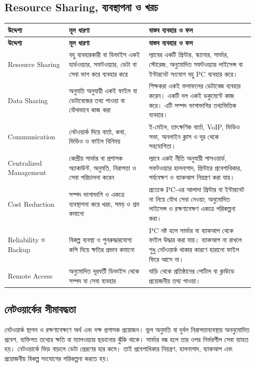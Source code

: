\subsection{Resource Sharing, ব্যবস্থাপনা ও খরচ}
\begin{longtable}{|p{}|p{}|p{}|}\hline
\textbf{উদ্দেশ্য} & \textbf{মূল ধারণা} & \textbf{বাস্তব ব্যবহার ও ফল}\\\hline
\endfirsthead\hline\textbf{উদ্দেশ্য} & \textbf{মূল ধারণা} & \textbf{বাস্তব ব্যবহার ও ফল}\\\hline\endhead
Resource Sharing & বহু ব্যবহারকারী বা ডিভাইস একই হার্ডওয়্যার, সফটওয়্যার, ডেটা বা সেবা ভাগ করে ব্যবহার করে & ল্যাবের একটি প্রিন্টার, স্ক্যানার, সার্ভার, স্টোরেজ, অনুমোদিত সফটওয়্যার লাইসেন্স বা ইন্টারনেট সংযোগ বহু PC ব্যবহার করে।\\\hline
Data Sharing & অনুমতি অনুযায়ী একই ফাইল বা ডেটাবেজের তথ্য পাওয়া বা যৌথভাবে কাজ করা & শিক্ষকরা একই ফলাফলের ডেটাবেজ ব্যবহার করেন। একটি দল একই ডকুমেন্টে কাজ করে। এটি সম্পদ ভাগাভাগির তথ্যভিত্তিক ব্যবহার।\\\hline
Communication & নেটওয়ার্ক দিয়ে বার্তা, কথা, ভিডিও ও ফাইল বিনিময় & ই-মেইল, তাৎক্ষণিক বার্তা, VoIP, ভিডিও সভা, অনলাইন ক্লাস ও দূর থেকে সহযোগিতা।\\\hline
Centralized Management & কেন্দ্রীয় সার্ভার বা প্রশাসক অ্যাকাউন্ট, অনুমতি, নিরাপত্তা ও সেবা পরিচালনা করেন & ল্যাবে একই নীতি অনুযায়ী পাসওয়ার্ড, সফটওয়্যার হালনাগাদ, প্রিন্টারে প্রবেশাধিকার, পর্যবেক্ষণ ও ব্যাকআপ নিয়ন্ত্রণ করা যায়।\\\hline
Cost Reduction & সম্পদ ভাগাভাগি ও একত্রে ব্যবস্থাপনা করে খরচ, সময় ও শ্রম কমানো & প্রত্যেক PC-এর আলাদা প্রিন্টার বা ইন্টারনেট না নিয়ে যৌথ সেবা নেওয়া; অনুমোদিত লাইসেন্স ও রক্ষণাবেক্ষণ একত্রে পরিকল্পনা করা।\\\hline
Reliability ও Backup & বিকল্প ব্যবস্থা ও পুনরুদ্ধারযোগ্য কপি দিয়ে ক্ষতির প্রভাব কমানো & PC নষ্ট হলে সার্ভার বা ব্যাকআপ থেকে ফাইল উদ্ধার করা যায়। ব্যাকআপ না রাখলে শুধু নেটওয়ার্ক থাকার কারণে হারানো ফাইল ফিরে আসে না।\\\hline
Remote Access & অনুমোদিত দূরবর্তী ডিভাইস থেকে সম্পদ বা সেবা ব্যবহার & বাড়ি থেকে প্রতিষ্ঠানের পোর্টাল বা ক্লাউডে প্রয়োজনীয় তথ্য পাওয়া।\\\hline
\end{longtable}
\subsection{নেটওয়ার্কের সীমাবদ্ধতা}
নেটওয়ার্ক স্থাপন ও রক্ষণাবেক্ষণে অর্থ এবং দক্ষ প্রশাসক প্রয়োজন। ভুল অনুমতি বা দুর্বল নিরাপত্তাব্যবস্থায় অননুমোদিত প্রবেশ, ব্যক্তিগত তথ্যের ক্ষতি বা ম্যালওয়্যার ছড়ানোর ঝুঁকি থাকে। সার্ভার বন্ধ হলে তার ওপর নির্ভরশীল সেবা ব্যাহত হয়। নেটওয়ার্কে ভিড় বাড়লে ডেটা প্রেরণের হার কমে। তাই প্রবেশাধিকার নিয়ন্ত্রণ, হালনাগাদ, ব্যাকআপ এবং প্রয়োজনীয় বিকল্প সংযোগের পরিকল্পনা করতে হয়।
